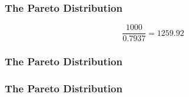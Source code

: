 \documentclass[IntroMain.tex]{subfiles}
\begin{document}
\begin{frame}
	\frametitle{The Pareto Distribution}
	\LARGE
	\vspace{-3.2cm}
\[\frac{1000}{0.7937} = 1259.92\]
\end{frame}
\begin{frame}
	\frametitle{The Pareto Distribution}
	\LARGE
	
\end{frame}
\begin{frame}
	\frametitle{The Pareto Distribution}
	\LARGE
	
\end{frame}
\end{document}
